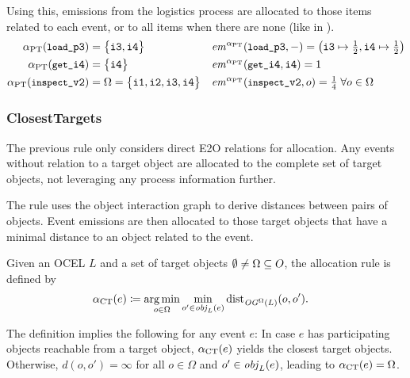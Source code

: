 Using this, emissions from the logistics process are allocated to those items related to each event, or to all items when there are none (like in ).
\begin{align*}
  \alphaPT(\ev{load}{p3}) &= \bigl\{ \itm{3}, \itm{4} \bigr\} &
  \emAlloc{\alphaPT}&(\ev{load}{p3},-) = \bigl( \itm{3}\mapsto\tfrac{1}{2}, \itm{4}\mapsto\tfrac{1}{2} \bigr)
  \\ %
  \alphaPT(\ev{get}{i4}) &= \bigl\{ \itm{4} \bigr\} &
  \emAlloc{\alphaPT}&(\ev{get}{i4},\itm{4}) = 1
  \\ %
  \alphaPT(\ev{inspect}{v2}) &= \Omega = \allitms &
  \emAlloc{\alphaPT}&(\ev{inspect}{v2},o) = \tfrac{1}{4} \;\forall o\in\Omega
\end{align*}

\subsubsection*{ClosestTargets}
The previous rule only considers direct E2O relations for allocation.
Any events without relation to a target object are allocated to the complete set of target objects, not leveraging any process information further.

The  rule uses the object interaction graph to derive distances between pairs of objects. Event emissions are then allocated to those target objects that have a minimal distance to an object related to the event.

\begin{definition}
  Given an OCEL $L$ and a set of target objects $\emptyset\neq\Omega\subseteq O$,
  the  allocation rule is defined by
  \begin{align*}
    \alpha_\text{CT}(e)
    &\coloneqq
      \operatorname*{arg\,min}_{o \in\Omega} \min_{o'\in\mathit{obj}_L(e)} \operatorname{dist}_{\mathit{OG}^\Omega(L)}(o,o').
  \end{align*}
  \label{def:CT}
\end{definition}

The definition implies the following for any event $e$:
In case $e$ has participating objects reachable from a target object,
$\alpha_\text{CT}(e)$ yields the closest target objects. Otherwise, $d(o,o')=\infty$ for all $o\in\Omega$ and $o'\in\mathit{obj}_L(e)$, leading to $\alpha_\text{CT}(e)=\Omega$.


